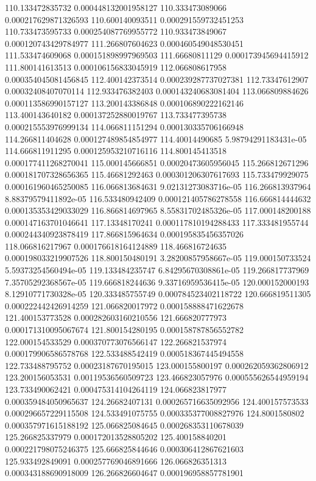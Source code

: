 {110.133472835732 0.000448132001958127
110.333473089066 0.000217629871326593
110.600140093511 0.000291559732451253
110.733473595733 0.000254087769955772
110.933473849067 0.000120743429784977
111.266807604623 0.000460549048530451
111.533474609068 0.000151898997969503
111.66680811129 0.000173945694415912
111.800141613513 0.000106156833045919
112.066808617958 0.000354045081456845
112.400142373514 0.000239287737027381
112.73347612907 0.00032408407070114
112.933476382403 0.000143240683081404
113.066809884626 0.000113586990157127
113.200143386848 0.000106890222162146
113.400143640182 0.000137252880019767
113.733477395738 0.000215553976999134
114.066811151294 0.000130335706166948
114.266811404628 0.000127489854854977
114.40014490685 5.98794291183431e-05
114.666811911295 0.000125953210716116
114.800145413518 0.000177411268270041
115.000145666851 0.00020473605956045
115.266812671296 0.000181707328656365
115.46681292463 0.000301206307617693
115.733479929075 0.000161960465250085
116.066813684631 9.02131273083716e-05
116.266813937964 8.88379579411892e-05
116.533480942409 0.000121405786278558
116.666814444632 0.000135353429033029
116.866814697965 8.55831702485326e-05
117.000148200188 0.000147163701046641
117.13348170241 0.000117810194288433
117.333481955744 0.000244340923878419
117.866815964634 0.000195835456357026
118.066816217967 0.000176618164124889
118.466816724635 0.000198033219907526
118.800150480191 3.28200857958667e-05
119.000150733524 5.59373254560494e-05
119.133484235747 6.84295670308861e-05
119.266817737969 7.35705292368567e-05
119.666818244636 9.33716959536415e-05
120.000152000193 8.12910771730328e-05
120.333485755749 0.000784523402118722
120.666819511305 0.000222442426914259
121.066820017972 0.000158888471622678
121.400153773528 0.000282603160210556
121.666820777973 0.000171310095067674
121.800154280195 0.000158787856552782
122.000154533529 0.000370773076566147
122.266821537974 0.000179906586578768
122.533488542419 0.000518367445494558
122.733488795752 0.00023187670195015
123.000155800197 0.000262059362806912
123.200156053531 0.00119536560509723
123.466823057976 0.000555626544959194
123.733490062421 0.000475314104264119
124.066823817977 0.000359484050965637
124.26682407131 0.000265716635092956
124.400157573533 0.000296657229115508
124.533491075755 0.000335377008827976
124.8001580802 0.000357971615188192
125.066825084645 0.000268353110678039
125.266825337979 0.000172013528805202
125.400158840201 0.000221798075246375
125.666825844646 0.000306412867621603
125.933492849091 0.000257769046891666
126.066826351313 0.000343188690918009
126.266826604647 0.000196958857781901
}
